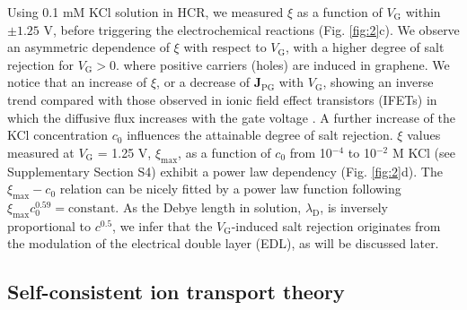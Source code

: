 \documentclass[journal=langd5,email=true, hyperref=true, keywords=false]{achemso}
\newcommand{\Fig}{Fig.}
\begin{document}
Using 0.1 mM KCl solution in HCR, we measured $\xi$ as a function of
$V_{\mathrm{G}}$ within $\pm1.25$ V, before triggering the
electrochemical reactions (\Fig{} \ref{fig:2}c). We observe an
asymmetric dependence of $\xi$ with respect to $V_{\mathrm{G}}$, with
a higher degree of salt rejection for $V_{\mathrm{G}}>0$. where
positive carriers (holes) are induced in graphene. We notice that an
increase of $\xi$, or a decrease of $\boldsymbol{J}_{\mathrm{PG}}$
with $V_{\mathrm{G}}$, showing an inverse trend compared with those
observed in ionic field effect transistors (IFETs) in which the
diffusive flux increases with the gate voltage
\cite{Nam_2009,Cheng_2018}. A further increase of the KCl
concentration $c_{0}$ influences the attainable degree of salt
rejection. $\xi$ values measured at $V_{\mathrm{G}}$ = 1.25 V,
$\xi_{\mathrm{max}}$, as a function of $c_{0}$ from 10$^{-4}$ to
10$^{-2}$ M KCl (see Supplementary Section S4) exhibit a power law
dependency (\Fig{} \ref{fig:2}d). The $\xi_{\mathrm{max}}-c_{0}$
relation can be nicely fitted by a power law function following
$\xi_{\mathrm{max}} c_{0}^{0.59} = \mathrm{constant}$. As the Debye
length in solution, $\lambda_{\mathrm{D}}$, is inversely proportional
to $c^{0.5}$, we infer that the $V_{\mathrm{G}}$-induced salt
rejection originates from the modulation of the electrical double
layer (EDL), as will be discussed later.

\subsection{Self-consistent ion transport theory}
\label{sec:theory}
\end{document}
